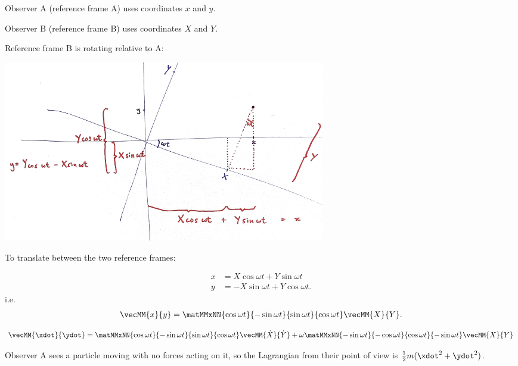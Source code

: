 Observer A (reference frame A) uses coordinates $x$ and $y$.

Observer B (reference frame B) uses coordinates $X$ and $Y$.

Reference frame B is rotating relative to A:

\begin{mdframed}
  \includegraphics[width=400pt]{img/physics--susskind--the-theoretical-minimum--1.-the-nature-of-classical-mechanics--6.-the-principle-of-least-action--28fe.png}
\end{mdframed}

To translate between the two reference frames:

\begin{align*}
    x &= X \cos \omega t + Y \sin \omega t \\
    y &= -X \sin \omega t + Y \cos \omega t.
  \end{align*}
  i.e.
\begin{align*}
  \vecMM{x}{y} = \matMMxNN{\cos \omega t}{-\sin \omega t}{\sin \omega t}{\cos \omega t} \vecMM{X}{Y}.
\end{align*}

\begin{align*}
  \vecMM{\xdot}{\ydot} =
        \matMMxNN{ \cos \omega t}{-\sin \omega t}{\sin \omega t}{\cos \omega t} \vecMM{\dot{X}}{\dot{Y}} +
  \omega\matMMxNN{-\sin \omega t}{-\cos \omega t}{\cos \omega t}{-\sin \omega t} \vecMM{X}{Y}
\end{align*}
\TODO


Observer A sees a particle moving with no forces acting on it, so the Lagrangian from their point of view
is $\frac{1}{2}m(\xdot^2 + \ydot^2)$.

